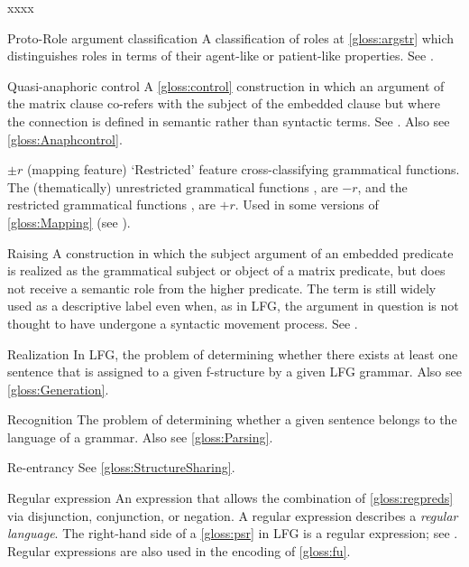 \documentclass[output=paper,colorlinks,citecolor=brown]{langscibook}
\begin{document}
\begin{labeling}{xxxx}
\item[Proto-Role argument classification] A classification of roles at \ref{gloss:argstr} which distinguishes roles in terms of their agent-like or patient-like properties.  See .

\item[Quasi-anaphoric control\namedlabel{gloss:quasi-anaphoric}{quasi-anaphoric}] A \ref{gloss:control} construction in which an argument of the matrix clause co-refers with the subject of the embedded clause but where the connection is defined in semantic rather than syntactic terms. See .  Also see \ref{gloss:Anaphcontrol}. 
  
\item[{${\pm}r$}\namedlabel{gloss:r}{$\underline{+}r$}] (mapping feature) `Restricted' feature cross-classifying grammatical functions.  The (thematically) unrestricted grammatical functions \SUBJ, \OBJ are $-r$, and the restricted grammatical functions \OBJTHETA, \OBLTHETA are $+r$.  Used in some versions of \ref{gloss:Mapping} (see ).

\item[Raising\namedlabel{gloss:raising}{raising}] A construction in which the subject argument of an embedded predicate is realized as the grammatical subject or object of a matrix predicate, but does not receive a semantic role from the higher predicate. The term is still widely used as a descriptive label even when, as in LFG, the argument in question is not thought to have undergone a syntactic movement process. See .
  
\item[Realization\namedlabel{gloss:realized}{realized}\namedlabel{gloss:Realization}{Realization}] In LFG, the problem of determining whether there exists at least one sentence that is assigned to a given f-structure by a given LFG grammar.  Also see \ref{gloss:Generation}.

\item[Recognition\namedlabel{gloss:recognized}{recognized}] The problem of determining whether a given sentence belongs to the language of a grammar.  Also see \ref{gloss:Parsing}.

\item[Re-entrancy] See \ref{gloss:StructureSharing}.

\item[Regular expression\namedlabel{gloss:regex}{regular expression}] An expression that allows the combination of \ref{gloss:regpreds} via disjunction, conjunction, or negation.  A regular expression describes a \emph{regular language}.  The right-hand side of a \ref{gloss:psr} in LFG is a regular expression; see \citetv[\ref{sect:intro:c-structure}]{chapters/Intro}.  Regular expressions are also used in the encoding of \ref{gloss:fu}.


\end{labeling}
\end{document}
